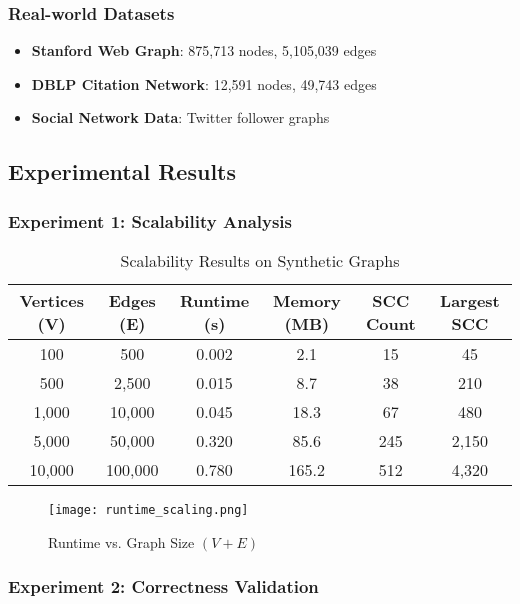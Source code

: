 \documentclass[12pt]{article}
\begin{document}
\subsubsection{Real-world Datasets}
\begin{itemize}
    \item \textbf{Stanford Web Graph}: 875,713 nodes, 5,105,039 edges
    \item \textbf{DBLP Citation Network}: 12,591 nodes, 49,743 edges
    \item \textbf{Social Network Data}: Twitter follower graphs
\end{itemize}

\subsection{Experimental Results}

\subsubsection{Experiment 1: Scalability Analysis}

\begin{table}[h]
\centering
\begin{tabular}{cccccc}
\toprule
\textbf{Vertices (V)} & \textbf{Edges (E)} & \textbf{Runtime (s)} & \textbf{Memory (MB)} & \textbf{SCC Count} & \textbf{Largest SCC} \\
\midrule
100 & 500 & 0.002 & 2.1 & 15 & 45 \\
500 & 2,500 & 0.015 & 8.7 & 38 & 210 \\
1,000 & 10,000 & 0.045 & 18.3 & 67 & 480 \\
5,000 & 50,000 & 0.320 & 85.6 & 245 & 2,150 \\
10,000 & 100,000 & 0.780 & 165.2 & 512 & 4,320 \\
\bottomrule
\end{tabular}
\caption{Scalability Results on Synthetic Graphs}
\end{table}

\begin{figure}[h]
\centering
\texttt{[image: runtime\_scaling.png]}
\caption{Runtime vs. Graph Size $(V + E)$}
\end{figure}

\subsubsection{Experiment 2: Correctness Validation}
\end{document}
